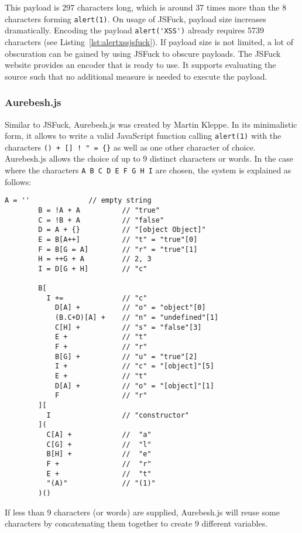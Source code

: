This payload is 297 characters long, which is around 37 times more than the 8 characters forming \verb|alert(1)|. On usage of JSFuck, payload size increases dramatically. Encoding the payload \verb|alert('XSS')| already requires 5739 characters (see Listing~\ref{lst:alertxssjsfuck}). If payload size is not limited, a lot of obscuration can be gained by using JSFuck to obscure payloads. The JSFuck website provides an encoder that is ready to use. It supports evaluating the source such that no additional measure is needed to execute the payload. \cite{mk/jsfuck}


\subsubsection{Aurebesh.js}
\label{sec:aurebesh}
Similar to JSFuck, Aurebesh.js was created by Martin Kleppe. In its minimalistic form, it allows to write a valid JavaScript function calling \verb|alert(1)| with the characters \verb|() + [] ! " = {}| as well as one other character of choice. Aurebesh.js allows the choice of up to 9 distinct characters or words. In the case where the characters \verb|A B C D E F G H I| are chosen, the system is explained as follows:
\begin{lstlisting}[style=basicStyle, caption=Aurebesh.js explanation \cite{mk/aurebesh}, label={lst:aurebeshexplanation}]
		A = ''              // empty string
		B = !A + A          // "true"
		C = !B + A          // "false"
		D = A + {}          // "[object Object]"
		E = B[A++]          // "t" = "true"[0]
		F = B[G = A]        // "r" = "true"[1]
		H = ++G + A         // 2, 3
		I = D[G + H]        // "c"

		B[
		  I +=              // "c"
		    D[A] +          // "o" = "object"[0]
		    (B.C+D)[A] +    // "n" = "undefined"[1]
		    C[H] +          // "s" = "false"[3]
		    E +             // "t"
		    F +             // "r"
		    B[G] +          // "u" = "true"[2]
		    I +             // "c" = "[object]"[5]
		    E +             // "t"
		    D[A] +          // "o" = "[object]"[1]
		    F               // "r"
		][
		  I                 // "constructor"
		](
		  C[A] +            //  "a"
		  C[G] +            //  "l"
		  B[H] +            //  "e"
		  F +               //  "r"
		  E +               //  "t"
		  "(A)"             // "(1)"
		)()
\end{lstlisting}
If less than 9 characters (or words) are supplied, Aurebesh.js will reuse some characters by concatenating them together to create 9 different variables. \cite{mk/aurebesh}

